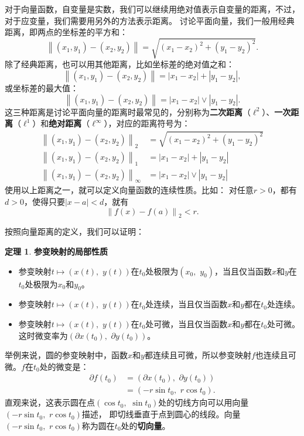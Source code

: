 \documentclass[12pt,UTF8]{ctexbook}
\theoremstyle{definition}
\newtheorem{tm}{定理}[section]
\theoremstyle{plain}
\begin{document}
对于向量函数，自变量是实数，我们可以继续用绝对值表示自变量的距离，不过，对于应变量，我们需要用另外的方法表示距离。
讨论平面向量，我们一般用经典距离，即两点的坐标差的平方和：
$$ \left\| (x_1, y_1) - (x_2, y_2)\right\| = \sqrt{(x_1 - x_2)^2 + (y_1 - y_2)^2}. $$
除了经典距离，也可以用其他距离，比如坐标差的绝对值之和：
$$ \left\| (x_1, y_1) - (x_2, y_2)\right\| = |x_1 - x_2| + |y_1 - y_2|,$$
或坐标差的最大值：
$$ \left\| (x_1, y_1) - (x_2, y_2)\right\| = |x_1 - x_2| \vee |y_1 - y_2|. $$
这三种距离是讨论平面向量的距离时最常见的，分别称为\textbf{二次距离}（$\ell^2$）、\textbf{一次距离}（$\ell^1$）和\textbf{绝对距离}（$\ell^{\infty}$），对应的距离符号为：
\begin{align*}
    \left\| (x_1, y_1) - (x_2, y_2)\right\|_2 &= \sqrt{(x_1 - x_2)^2 + (y_1 - y_2)^2} \\
    \left\| (x_1, y_1) - (x_2, y_2)\right\|_1 &= |x_1 - x_2| + |y_1 - y_2| \\
    \left\| (x_1, y_1) - (x_2, y_2)\right\|_\infty &= |x_1 - x_2| \vee |y_1 - y_2|
\end{align*}
使用以上距离之一，就可以定义向量函数的连续性质。比如：
对任意$r>0$，都有$d>0$，使得只要$|x - a| < d$，就有
$$\left\|f(x) - f(a)\right\|_2 < r.$$

按照向量距离的定义，我们可以证明：
\begin{tm}
    \textbf{参变映射的局部性质}\\
    \begin{itemize}
        \item 参变映射$t\mapsto (x(t),\,\, y(t))$在$t_0$处极限为$(x_0,\,\,y_0)$，当且仅当函数$x$和$y$在$t_0$处极限为$x_0$和$y_0$。
        \item 参变映射$t\mapsto (x(t),\,\, y(t))$在$t_0$处连续，当且仅当函数$x$和$y$都在$t_0$处连续。
        \item 参变映射$t\mapsto (x(t),\,\, y(t))$在$t_0$处可微，当且仅当函数$x$和$y$都在$t_0$处可微。这时微变率为$(\partial x(t_0),\,\,\partial y(t_0))$。
    \end{itemize}
\end{tm}

举例来说，圆的参变映射中，函数$x$和$y$都连续且可微，所以参变映射$f$也连续且可微。$f$在$t_0$处的微变是：
\begin{align*}
    \partial f(t_0) &= (\partial x(t_0),\,\,\partial y(t_0)) \\
    &= (-r\sin{t_0},\,\, r\cos{t_0}).
\end{align*}
直观来说，这表示圆在点$(\cos{t_0},\,\,\sin{t_0})$处的切线方向可以用向量$(-r\sin{t_0},\,\, r\cos{t_0})$描述，
即切线垂直于点到圆心的线段。向量$(-r\sin{t_0},\,\, r\cos{t_0})$称为圆在$t_0$处的\textbf{切向量}。
\end{document}
